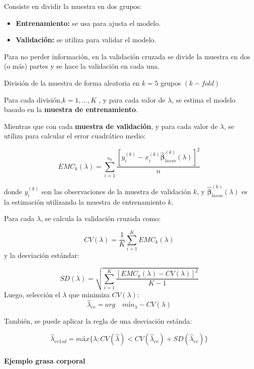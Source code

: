 \documentclass[
]{article}
\providecommand{\tightlist}{%
  \setlength{\itemsep}{0pt}\setlength{\parskip}{0pt}}
\begin{document}
Consiste en dividir la muestra en dos grupos:

\begin{itemize}
\tightlist
\item
  \textbf{Entrenamiento:} se usa para ajusta el modelo.
\item
  \textbf{Validación:} se utiliza para validar el modelo.
\end{itemize}

Para no perder información, en la validación cruzada se divide la
muestra en dos (o más) partes y se hace la validación en cada una.

División de la muestra de forma aleatoria en \(k = 5\) grupos \((k-fold)\)

Para cada división,\(k = 1, . . . , K\) , y para cada valor de \(\lambda\), se estima
el modelo basado en la \textbf{muestra de entrenamiento}.

Mientras que con cada \textbf{muestra de validación}, y para cada valor de
\(\lambda\), se utiliza para calcular el error cuadrático medio:

\[
EMC_{k}(\lambda) = \sum_{i=1}^{n_k} \frac{[y_{i}^{(k)}-x_{i}^{(k)}\widehat{\boldsymbol \beta}_{lasso}^{(k)}(\lambda)]^2}{n}               
\]

donde \(y_{i}^{(k)}\) son las observaciones de la muestra de validación \(k\), y \(\widehat{\boldsymbol \beta}_{lasso}^{(k)}(\lambda)\) es la estimación utilizando la muestra de entrenamiento \(k\).

Para cada \(\lambda\), se calcula la validación cruzada como:

\[
CV(\lambda) = \frac{1}{K}\sum_{i=1}^{K}EMC_{k}(\lambda)              
\]
y la desviación estándar:

\[
SD(\lambda) = \sqrt{\sum_{i=1}^{K} \frac{[EMC_{k}(\lambda)-CV(\lambda)]^2}{K-1}}              
\]
Luego, selección el \(\lambda\) que minimiza \(CV(\lambda)\):
\[
\hat{\lambda}_{cv}=arg\quad mín_{\lambda}-CV(\lambda)
\]

También, se puede aplicar la regla de una desviación estánda:

\[
\hat{\lambda}_{cv1sd}=máx \{\lambda:CV(\hat{\lambda})<CV(\hat{\lambda}_{cv})+SD(\hat{\lambda}_{cv})\}
\]

\hypertarget{ejemplo-grasa-corporal}{%
\paragraph{Ejemplo grasa corporal}\label{ejemplo-grasa-corporal}}
\end{document}

